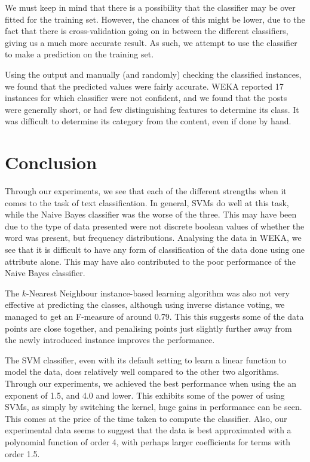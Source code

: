 \documentclass[12pt]{article}
\begin{document}
We must keep in mind that there is a possibility that the classifier may be over fitted for the training set. However, the chances of this might be lower, due to the fact that there is cross-validation going on in between the different classifiers, giving us a much more accurate result. As such, we attempt to use the classifier to make a prediction on the training set. 

Using the output and manually (and randomly) checking the classified instances, we found that the predicted values were fairly accurate. WEKA reported 17 instances for which classifier were not confident, and we found that the posts were generally short, or had few distinguishing features to determine its class. It was difficult to determine its category from the content, even if done by hand. 


\section{Conclusion}
Through our experiments, we see that each of the different strengths when it comes to the task of text classification. In general, SVMs do well at this task, while the Naive Bayes classifier was the worse of the three. This may have been due to the type of data presented were not discrete boolean values of whether the word was present, but frequency distributions. Analysing the data in WEKA, we see that it is difficult to have any form of classification of the data done using one attribute alone. This may have also contributed to the poor performance of the Naive Bayes classifier.

The $k$-Nearest Neighbour instance-based learning algorithm was also not very effective at predicting the classes, although using inverse distance voting, we managed to get an F-measure of around 0.79. This this suggests some of the data points are close together, and penalising points just slightly further away from the newly introduced instance improves the performance.

The SVM classifier, even with its default setting to learn a linear function to model the data, does relatively well compared to the other two algorithms. Through our experiments, we achieved the best performance when using the an exponent of 1.5, and 4.0 and lower. This exhibits some of the power of using SVMs, as simply by switching the kernel, huge gains in performance can be seen. This comes at the price of the time taken to compute the classifier. Also, our experimental data seems to suggest that the data is best approximated with a polynomial function of order 4, with perhaps larger coefficients for terms with order 1.5.
\end{document}
